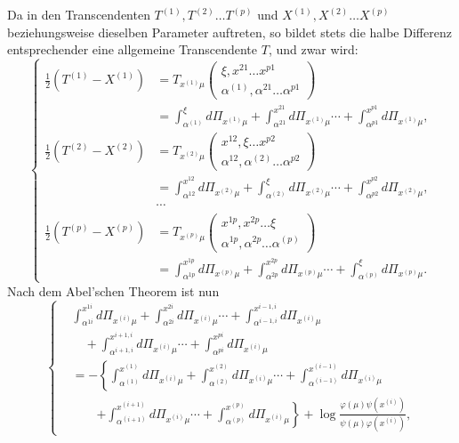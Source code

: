 \documentclass[10pt]{article}
\begin{document}
Da in den Transcendenten \(T^{(1)},T^{(2)}\ldots T^{(p)}\) und \(X^{(1)},X^{(2)}\ldots X^{(p)}\) beziehungsweise dieselben Parameter auftreten, so bildet stets die halbe Differenz entsprechender eine allgemeine Transcendente \(T\), und zwar wird:
\begingroup\footnotesize
\[
\left\{
\begin{aligned}
\frac12(T^{(1)}-X^{(1)})
&=T_{x^{(1)}\mu}\begin{pmatrix}\xi,x^{21}\ldots x^{p1}\\ \alpha^{(1)},\alpha^{21}\ldots\alpha^{p1}\end{pmatrix} \\
&=\int_{\alpha^{(1)}}^{\xi}d\Pi_{x^{(1)}\mu}
+\int_{\alpha^{21}}^{x^{21}}d\Pi_{x^{(1)}\mu}\cdots
+\int_{\alpha^{p1}}^{x^{p1}}d\Pi_{x^{(1)}\mu},\\[0.35em]
\frac12(T^{(2)}-X^{(2)})
&=T_{x^{(2)}\mu}\begin{pmatrix}x^{12},\xi\ldots x^{p2}\\ \alpha^{12},\alpha^{(2)}\ldots\alpha^{p2}\end{pmatrix} \\
&=\int_{\alpha^{12}}^{x^{12}}d\Pi_{x^{(2)}\mu}
+\int_{\alpha^{(2)}}^{\xi}d\Pi_{x^{(2)}\mu}\cdots
+\int_{\alpha^{p2}}^{x^{p2}}d\Pi_{x^{(2)}\mu},\\[-0.2em]
&\cdots\\[-0.2em]
\frac12(T^{(p)}-X^{(p)})
&=T_{x^{(p)}\mu}\begin{pmatrix}x^{1p},x^{2p}\ldots\xi\\ \alpha^{1p},\alpha^{2p}\ldots\alpha^{(p)}\end{pmatrix} \\
&=\int_{\alpha^{1p}}^{x^{1p}}d\Pi_{x^{(p)}\mu}
+\int_{\alpha^{2p}}^{x^{2p}}d\Pi_{x^{(p)}\mu}\cdots
+\int_{\alpha^{(p)}}^{\xi}d\Pi_{x^{(p)}\mu}.
\end{aligned}
\right.
\tag{3}
\]
\endgroup
Nach dem Abel'schen Theorem ist nun
\begingroup\footnotesize
\[
\left\{
\begin{aligned}
&\int_{\alpha^{1i}}^{x^{1i}}d\Pi_{x^{(i)}\mu}
+\int_{\alpha^{2i}}^{x^{2i}}d\Pi_{x^{(i)}\mu}\cdots
+\int_{\alpha^{i-1,i}}^{x^{i-1,i}}d\Pi_{x^{(i)}\mu} \\
&\quad +\int_{\alpha^{i+1,i}}^{x^{i+1,i}}d\Pi_{x^{(i)}\mu}\cdots
+\int_{\alpha^{pi}}^{x^{pi}}d\Pi_{x^{(i)}\mu} \\
&= -\left\{
\int_{\alpha^{(1)}}^{x^{(1)}}d\Pi_{x^{(i)}\mu}
+\int_{\alpha^{(2)}}^{x^{(2)}}d\Pi_{x^{(i)}\mu}\cdots
+\int_{\alpha^{(i-1)}}^{x^{(i-1)}}d\Pi_{x^{(i)}\mu}
\right.\\
&\qquad\left.
+\int_{\alpha^{(i+1)}}^{x^{(i+1)}}d\Pi_{x^{(i)}\mu}\cdots
+\int_{\alpha^{(p)}}^{x^{(p)}}d\Pi_{x^{(i)}\mu}\right\}
+\log\frac{\varphi(\mu)\psi(x^{(i)})}{\psi(\mu)\varphi(x^{(i)})},
\end{aligned}
\right.
\tag{4}
\]
\end{document}
